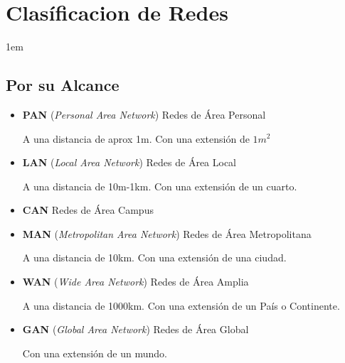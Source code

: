 \documentclass[12pt, fleqn]{report}                             %
\newenvironment{SmallIndentation}[1][0.75em]                    %
        {\begin{adjustwidth}{#1}{}\begin{footnotesize}}             %
        {\end{footnotesize}\end{adjustwidth}}                       %
\theoremstyle{break}                                            %
\begin{document}
        \section{Clasíficacion de Redes}
        \begin{SmallIndentation}[1em]

            \subsection{Por su Alcance}

                \begin{itemize}

                    \item 
                        \textbf{PAN} (\emph{Personal Area Network}) Redes de Área Personal

                            A una distancia de aprox 1m. Con una extensión de $1m^{2}$
                    \item 
                        \textbf{LAN} (\emph{Local Area Network}) Redes de Área Local

                            A una distancia de 10m-1km. Con una extensión de un cuarto.

                    \item 
                        \textbf{CAN} Redes de Área Campus
                         
                    \item
                        \textbf{MAN} (\emph{Metropolitan Area Network}) Redes de Área Metropolitana

                            A una distancia de 10km. Con una extensión de una ciudad.
                       
                    \item
                        \textbf{WAN} (\emph{Wide Area Network}) Redes de Área Amplia

                            A una distancia de 1000km. Con una extensión de un País o Continente.

                    \item
                        \textbf{GAN} (\emph{Global Area Network}) Redes de Área Global

                            Con una extensión de un mundo.


\end{itemize}
\end{SmallIndentation}
\end{document}
